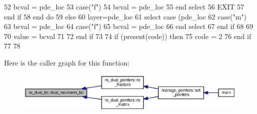 \begin{DoxyCode}
52                   bcval = pde\_loc%
53 \textcolor{comment}{                }\textcolor{keywordflow}{case}(\textcolor{stringliteral}{"f"})
54                   bcval = pde\_loc%
55 \textcolor{comment}{}\textcolor{keywordflow}{              end select}
56               \textcolor{keywordflow}{EXIT}
57 \textcolor{keywordflow}{            end if}
58 \textcolor{keywordflow}{          end do}
59         \textcolor{keywordflow}{else}
60           layer=pde\_loc%
61           \textcolor{keywordflow}{select case} (pde\_loc%
62             \textcolor{keywordflow}{case}(\textcolor{stringliteral}{"m"})
63               bcval = pde\_loc%
64             \textcolor{keywordflow}{case}(\textcolor{stringliteral}{"f"})
65               bcval = pde\_loc%
66 \textcolor{keywordflow}{          end select}
67 \textcolor{keywordflow}{        end if}
68     
69 
70         \textcolor{keywordtype}{value} = bcval
71 
72 \textcolor{keywordflow}{      end if}
73       
74       \textcolor{keywordflow}{if} (\textcolor{keyword}{present}(code)) \textcolor{keywordflow}{then}
75         code = 2
76 \textcolor{keywordflow}{      end if}
77 
78 
\end{DoxyCode}


Here is the caller graph for this function\+:\nopagebreak
\begin{figure}[H]
\begin{center}
\leavevmode
\includegraphics[width=350pt]{namespacere__dual__bc_a930f9415d0b3aa33933f05bdded7b2d1_icgraph}
\end{center}
\end{figure}


